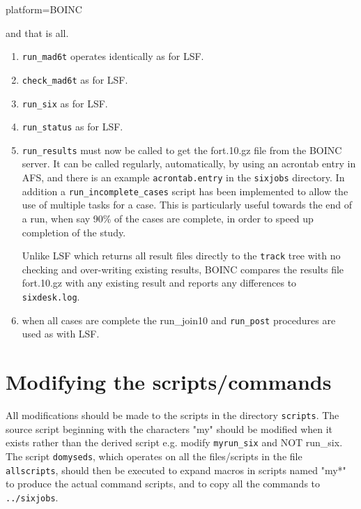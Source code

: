 \documentclass{cernatsnote}
\begin{document}
\begin{description}
\item[platform=BOINC]
\end{description}
and that is all.
\begin{enumerate}
\item \texttt{run\_mad6t} operates identically as for LSF.
\item \texttt{check\_mad6t} as for LSF.
\item \texttt{run\_six} as for LSF. 
\item \texttt{run\_status} as for LSF. 
\item \texttt{run\_results} must now be called to get the fort.10.gz file from the
BOINC server. It can be called regularly, automatically, by using an acrontab
entry in AFS, and there is an example \texttt{acrontab.entry} in the \texttt{sixjobs}
directory. In addition a \texttt{run\_incomplete\_cases} script has been
implemented to allow the use of multiple tasks for a case. This is particularly
useful towards the end of a run, when say 90\% of the cases are complete, in
order to speed up completion of the study.

Unlike LSF which returns all result files directly to the \texttt{track} tree with
no checking and over-writing existing results, BOINC compares the results file
fort.10.gz with any existing result and reports any differences to {\tt
sixdesk.log}.
\item when all cases are complete the {run\_join10} and \texttt{run\_post}
  procedures are used as with LSF.
\end{enumerate}

\section{Modifying the scripts/commands}

All modifications should be made to the scripts in the directory \texttt{scripts}.
The source script beginning with the characters "my" should be modified when it
exists rather than the derived script e.g. modify \texttt{myrun\_six} and NOT
{run\_six}. The script \texttt{domyseds}, which operates on all the files/scripts
in the file \texttt{allscripts}, should then be executed to expand macros in
scripts named "my*" to produce the actual command scripts, and to copy  all the
commands to \texttt{../sixjobs}.
\end{document}
